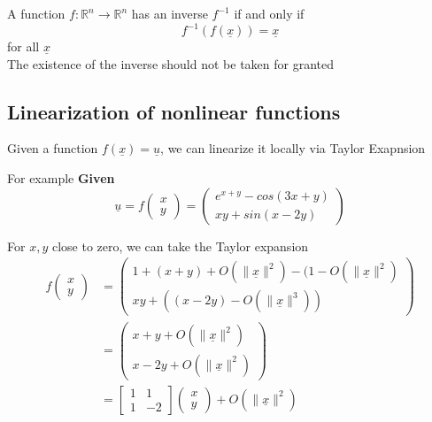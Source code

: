 \begin{framed}
   A function $f: \mathbb{R}^n \to \mathbb{R}^n$ has an inverse $f^{-1}$ if and only if  \[
      f^{-1}(f( \underline{x})) = \underline{x}
   \]  
   for all $ \underline{x}$  \\

   The existence of the inverse should not be taken for granted
\end{framed}

\subsection{Linearization of nonlinear functions}
\begin{framed}
   Given a function $f( \underline{x}) = \underline{u}$, we can linearize it locally via Taylor Exapnsion
\end{framed}

For example
\textbf{Given} \[
  \underline{u} = f \begin{pmatrix} x \\ y \end{pmatrix}  = \begin{pmatrix} 
  e^{x+y} - cos(3x + y) \\
  xy + sin(x - 2y)
  \end{pmatrix} 
\]  

For $x, y$ close to zero, we can take the Taylor expansion 
\begin{align*}
   f \begin{pmatrix} x \\ y \end{pmatrix}  &= \begin{pmatrix} 
    1 + (x + y) + O (\lVert \underline{x} \rVert ^2  ) - (1 - O \left( \lVert \underline{x} \rVert^2 \right) \\ 
    xy + ((x - 2y) - O \left( \lVert \underline{x} \rVert^3 \right)) 
  \end{pmatrix} \\
  &= \begin{pmatrix} x + y + O \left( \lVert \underline{x} \rVert^2 \right)   \\
     x - 2y + O \left( \lVert \underline{x} \rVert^2 \right) 
  \end{pmatrix}  \\
  &= \begin{bmatrix} 
     1 & 1 \\ 1 & -2  
  \end{bmatrix} \begin{pmatrix} x \\ y \end{pmatrix}  + O \left( \lVert \underline{x} \rVert^2 \right)
\end{align*}


